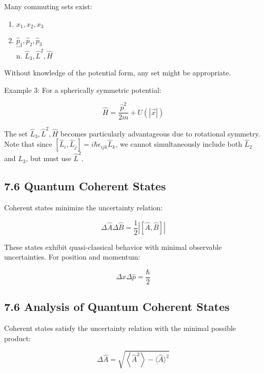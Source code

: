 \documentclass[10pt]{article}
\begin{document}
Many commuting sets exist:
\begin{enumerate}
  \item $x_{1}, x_{2}, x_{3}$
  \item $\hat{p}_{1}, \hat{p}_{2}, \hat{p}_{3}$\\
$\cdots$\\
n. $\hat{L}_{3}, \hat{L}^{2}, \hat{H}$
\end{enumerate}

Without knowledge of the potential form, any set might be appropriate.

Example 3: For a spherically symmetric potential:

\begin{equation*}
\hat{H}=\frac{\hat{p}^{2}}{2 m}+U(|\vec{x}|) \tag{7.42}
\end{equation*}

The set $\hat{L}_{3}, \hat{L}^{2}, \hat{H}$ becomes particularly advantageous due to rotational symmetry. Note that since $\left[\hat{L}_{i}, \hat{L}_{j}\right]=i \hbar \epsilon_{i j k} \hat{L}_{k}$, we cannot simultaneously include both $\hat{L}_{2}$ and $\hat{L}_{3}$, but must use $\hat{L}^{2}$.

\subsection*{7.6 Quantum Coherent States}
Coherent states minimize the uncertainty relation:

\begin{equation*}
\Delta \hat{A} \Delta \hat{B}=\frac{1}{2}|[\hat{A}, \hat{B}]| \tag{7.43}
\end{equation*}

These states exhibit quasi-classical behavior with minimal observable uncertainties. For position and momentum:

\begin{equation*}
\Delta x \Delta \hat{p}=\frac{\hbar}{2} \tag{7.44}
\end{equation*}


\subsection*{7.6 Analysis of Quantum Coherent States}
Coherent states satisfy the uncertainty relation with the minimal possible product:

\begin{equation*}
\Delta \hat{A}=\sqrt{\left\langle\hat{A}^{2}\right\rangle-\langle\hat{A}\rangle^{2}} \tag{7.45}
\end{equation*}
\end{document}
